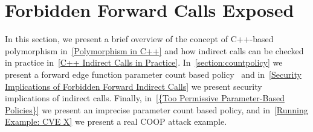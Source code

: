 \section{Forbidden Forward Calls Exposed}
\label{C++ Bad Forward Indirect Calls}
In this section, we present a brief overview of the concept of C++-based polymorphism in~\cref{Polymorphism in C++}
and how indirect calls can be checked in practice in~\cref{C++ Indirect Calls in Practice}.
In~\cref{section:countpolicy} we present a forward edge function parameter count based policy~\cite{veen:typearmor} 
and in~\cref{Security Implications of Forbidden Forward Indirect Calls} we present security implications of indirect calls.
Finally, in~\cref{{Too Permissive Parameter-Based Policies}} we present an imprecise parameter count based policy, and 
in~\cref{Running Example: CVE X} we present a real COOP attack example.

